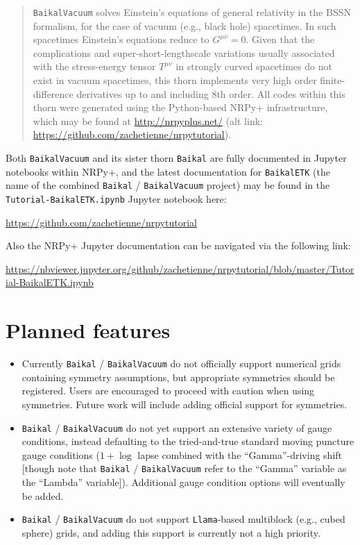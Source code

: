 \begin{abstract}
\texttt{BaikalVacuum} solves Einstein's equations of general
relativity in the BSSN formalism, for the case of vacuum (e.g., black
hole) spacetimes. In such spacetimes Einstein's equations reduce to
$G^{\mu \nu}=0$. Given that the complications and
super-short-lengthscale variations usually associated with the
stress-energy tensor $T^{\mu\nu}$ in strongly curved spacetimes do not
exist in vacuum spacetimes, this thorn implements very high order
finite-difference derivatives up to and including 8th order. All codes
within this thorn were generated using the Python-based NRPy+
infrastructure, which may be found at \url{http://nrpyplus.net/} (alt
link: \url{https://github.com/zachetienne/nrpytutorial}).
\end{abstract}

Both \texttt{BaikalVacuum} and its sister thorn \texttt{Baikal} are
fully documented in Jupyter notebooks within NRPy+, and
the latest documentation for \texttt{BaikalETK} (the name of the
combined \texttt{Baikal} / \texttt{BaikalVacuum} project) may be found
in the \texttt{Tutorial-BaikalETK.ipynb} Jupyter notebook here:

\url{https://github.com/zachetienne/nrpytutorial}

Also the NRPy+ Jupyter documentation can be navigated via the
following link:

\url{https://nbviewer.jupyter.org/github/zachetienne/nrpytutorial/blob/master/Tutorial-BaikalETK.ipynb}

\section{Planned features}

\begin{itemize}
\item Currently \texttt{Baikal} / \texttt{BaikalVacuum} do not officially
support numerical grids containing symmetry assumptions, but
appropriate symmetries should be registered. Users are encouraged to
proceed with caution when using symmetries. Future work will include adding
official support for symmetries.
\item \texttt{Baikal} / \texttt{BaikalVacuum} do not yet support an
  extensive variety of gauge conditions, instead defaulting to the
  tried-and-true standard moving puncture gauge conditions ($1+\log$
  lapse combined with the ``Gamma''-driving shift [though note that
    \texttt{Baikal} / \texttt{BaikalVacuum} refer to the  ``Gamma''
    variable as the ``Lambda'' variable]). Additional gauge condition
  options will eventually be added.
\item \texttt{Baikal} / \texttt{BaikalVacuum} do not support
  \texttt{Llama}-based multiblock (e.g., cubed sphere) grids, and
  adding this support is currently not a high priority.
\end{itemize}





